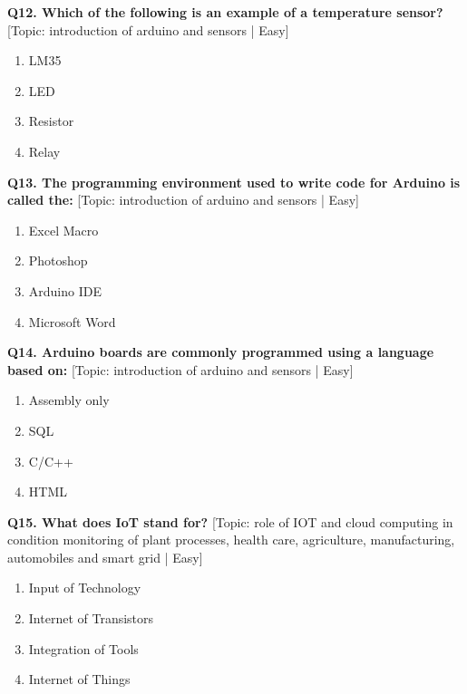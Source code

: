 \noindent\textbf{Q12. Which of the following is an example of a temperature sensor?} \hfill [Topic: introduction of arduino and sensors | Easy]
\begin{enumerate}[label=(\alph*),topsep=2pt,itemsep=1pt,partopsep=0pt,parsep=0pt]
    \item {LM35}
    \item {LED}
    \item {Resistor}
    \item {Relay}
\end{enumerate}
\vspace{2mm}

\noindent\textbf{Q13. The programming environment used to write code for Arduino is called the:} \hfill [Topic: introduction of arduino and sensors | Easy]
\begin{enumerate}[label=(\alph*),topsep=2pt,itemsep=1pt,partopsep=0pt,parsep=0pt]
    \item {Excel Macro}
    \item {Photoshop}
    \item {Arduino IDE}
    \item {Microsoft Word}
\end{enumerate}
\vspace{2mm}

\noindent\textbf{Q14. Arduino boards are commonly programmed using a language based on:} \hfill [Topic: introduction of arduino and sensors | Easy]
\begin{enumerate}[label=(\alph*),topsep=2pt,itemsep=1pt,partopsep=0pt,parsep=0pt]
    \item {Assembly only}
    \item {SQL}
    \item {C/C++}
    \item {HTML}
\end{enumerate}
\vspace{2mm}

\noindent\textbf{Q15. What does IoT stand for?} \hfill [Topic: role of IOT and cloud computing in condition monitoring of plant processes, health care, agriculture, manufacturing, automobiles and smart grid | Easy]
\begin{enumerate}[label=(\alph*),topsep=2pt,itemsep=1pt,partopsep=0pt,parsep=0pt]
    \item {Input of Technology}
    \item {Internet of Transistors}
    \item {Integration of Tools}
    \item {Internet of Things}
\end{enumerate}
\vspace{2mm}


